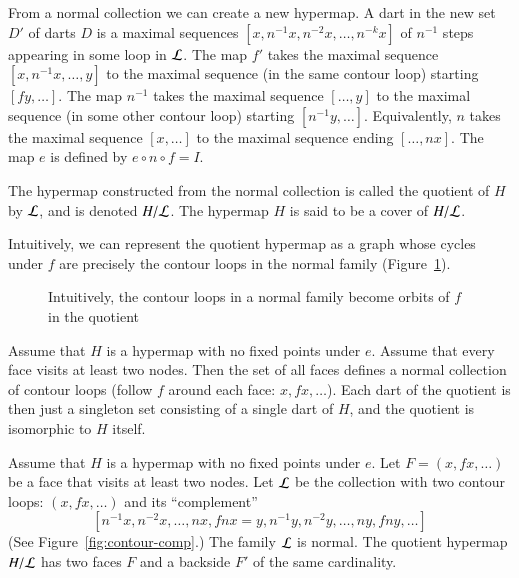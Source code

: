 From a normal collection we can create a new hypermap.   A dart in the
new set $D'$ of darts
$D$ is a maximal sequences $[x,n^{-1} x, n^{-2} x,\ldots,n^{-k} x]$
    of $n^{-1}$ steps appearing in some loop in $\cal L$.
The map $f'$ takes the maximal sequence
    $[x,n^{-1}x,\ldots,y]$ to the maximal
   sequence (in the same contour loop) starting 
    $[f y,\ldots]$.
The map $n^{-1}$ takes the maximal sequence
    $[\ldots,y]$ to the maximal sequence (in some other contour loop)
starting $[n^{-1}y,\ldots]$. Equivalently, $n$ takes the maximal sequence
$[x,\ldots]$ to the maximal sequence ending $[\ldots,n x]$. The map $e$ is
defined by $e\circ n\circ f = I$.  

\begin{definition}  The hypermap constructed from the normal collection
is called the quotient of $H$ by $\cal L$, and is denoted $H/{\cal
L}$.  The hypermap $H$ is said to be a cover of $H/{\cal L}$.
\end{definition}

Intuitively, we can represent the quotient hypermap as a graph whose
cycles under $f$ 
are precisely the contour loops in the normal family (Figure~\ref{fig:quot}).

\begin{figure}[htb]
  \centering
  \caption{Intuitively, 
   the contour loops in a normal family become orbits of $f$ in the
   quotient}
  \label{fig:quot}
\end{figure}


\begin{example}\label{ex:Hall} 
Assume that $H$ is a hypermap with no fixed points under $e$.
Assume that every face visits at least two nodes.
Then the set of all faces
defines a normal collection of contour loops (follow $f$ around each face:
$x,f x,\ldots$).  Each dart of the quotient is then just a singleton
set consisting of a single dart of $H$, and the quotient is
isomorphic to $H$ itself.
\end{example}

\begin{example}\label{ex:H2} 
Assume that $H$ is a hypermap with no fixed points
under $e$.  Let $F = (x,f x,\ldots)$ be a face that visits at least two nodes.  
Let $\cal L$ be the
collection with two contour loops:  $(x,f x,\ldots)$ and its
``complement''
$$[n^{-1} x,
n^{-2} x,\ldots,n x,f n x = y,n^{-1} y, n^{-2} y,\ldots, n y, f n
y,\ldots]
$$
(See Figure~\ref{fig:contour-comp}.) 
The family $\cal L$ is normal.
The quotient hypermap $H/{\cal L}$ has two faces $F$ and a
backside $F'$ of the same cardinality.
\end{example}


